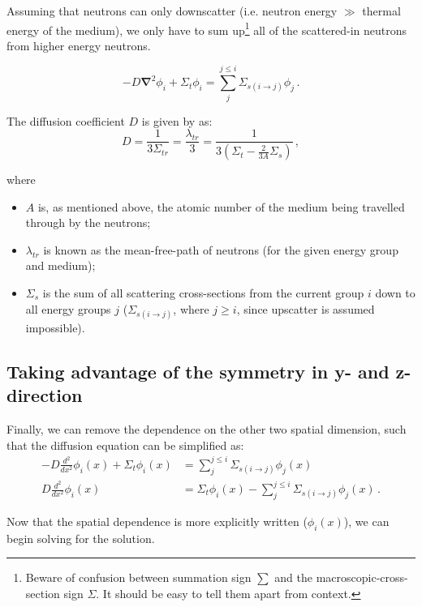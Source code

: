 \documentclass[a4paper, 12pt]{article}
\begin{document}
Assuming that neutrons can only downscatter (i.e. neutron energy $\gg$ thermal energy of the medium), we only have to sum up\footnote{Beware of confusion between summation sign $\sum$ and the macroscopic-cross-section sign $\Sigma$. It should be easy to tell them apart from context.} all of the scattered-in neutrons from higher energy neutrons.

\begin{equation}\label{eq:TransportEqFicksLawGroupwise}
    -D\boldsymbol{\nabla}^2\phi_i + \Sigma_t \phi_i =\sum_j^{j\le i} \Sigma_{s(i\rightarrow j)} \phi_j\,.
\end{equation}

The diffusion coefficient $D$ is given by \cite{Duderstadt} as:
\begin{equation}
    D = \frac{1}{3\Sigma_{tr}} = \frac{\lambda_{tr}}{3} = \frac{1}{3(\Sigma_t - \frac{2}{3A}{\Sigma_s})}\,,
\end{equation}

where
\begin{itemize}
    \item $A$ is, as mentioned above, the atomic number of the medium being travelled through by the neutrons;
    \item $\lambda_{tr}$ is known as the mean-free-path of neutrons (for the given energy group and medium);
    \item $\Sigma_s$ is the sum of all scattering cross-sections from the current group $i$ down to all energy groups $j$ ($\Sigma_{s(i\rightarrow j)}$, where $j\ge i$, since upscatter is assumed impossible).
\end{itemize}

\subsection{Taking advantage of the symmetry in y- and z-direction}
Finally, we can remove the dependence on the other two spatial dimension, such that the diffusion equation can be simplified as:
\begin{align}
    -D \frac{d^2}{dx^2}\phi_i(x) + \Sigma_t \phi_i(x) &= \sum_j^{j\le i} \Sigma_{s(i\rightarrow j)} \phi_j(x)\\
    D \frac{d^2}{dx^2}\phi_i(x) &= \Sigma_t \phi_i(x)  -\sum_j^{j\le i} \Sigma_{s(i\rightarrow j)} \phi_j(x)\,.\label{eq:TransportEqX}
\end{align}

Now that the spatial dependence is more explicitly written ($\phi_i(x)$), we can begin solving for the solution.
\end{document}
